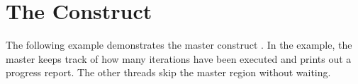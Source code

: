 \pagebreak
\chapter{The  Construct}
\label{chap:master}

The following example demonstrates the master construct . In the example, the master 
keeps track of how many iterations have been executed and prints out a progress 
report. The other threads skip the master region without waiting.





